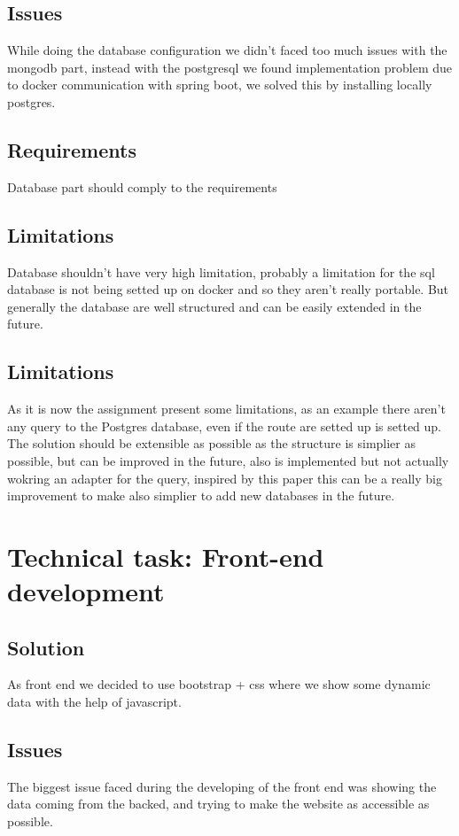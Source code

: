 \documentclass[conference]{IEEEtran}
\begin{document}
\subsection{Issues}
While doing the database configuration we didn't faced too much issues with the mongodb part, instead with the postgresql we found implementation problem due to docker communication with spring boot, we solved this by installing locally postgres.

\subsection{Requirements}
Database part should comply to the requirements

\subsection{Limitations}
Database shouldn't have very high limitation, probably a limitation for the sql database is not being setted up on docker and so they aren't really portable.
But generally the database are well structured and can be easily extended in the future.


\subsection{Limitations}
As it is now the assignment present some limitations, as an example there aren't any query to the Postgres database, even if the route are setted up is setted up. 
The solution should be extensible as possible as the structure is simplier as possible, but can be improved in the future, also is implemented but not actually wokring an adapter for the query, inspired by this paper \cite{Liao2016}
this can be a really big improvement to make also simplier to add new databases in the future. 

\section{Technical task: Front-end development}

\subsection{Solution}
As front end we decided to use bootstrap + css where we show some dynamic data with the help of javascript.
\subsection{Issues}
The biggest issue faced during the developing of the front end was showing the data coming from the backed, and trying to make the website as accessible as possible.
\end{document}
